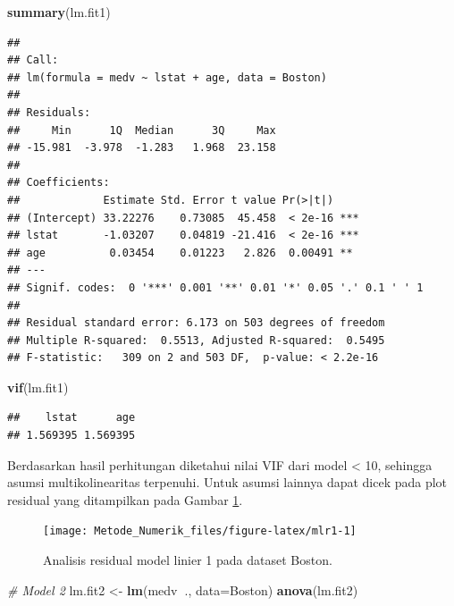 \documentclass[]{book}
\newenvironment{Shaded}{\begin{snugshade}}{\end{snugshade}}
\newcommand{\CommentTok}[1]{\textcolor[rgb]{0.56,0.35,0.01}{\textit{#1}}}
\newcommand{\DataTypeTok}[1]{\textcolor[rgb]{0.13,0.29,0.53}{#1}}
\newcommand{\KeywordTok}[1]{\textcolor[rgb]{0.13,0.29,0.53}{\textbf{#1}}}
\newcommand{\NormalTok}[1]{#1}
\newcommand{\OperatorTok}[1]{\textcolor[rgb]{0.81,0.36,0.00}{\textbf{#1}}}
\newcommand{\StringTok}[1]{\textcolor[rgb]{0.31,0.60,0.02}{#1}}
\theoremstyle{definition}
\theoremstyle{definition}
\theoremstyle{definition}
\theoremstyle{remark}
\begin{document}
\begin{Shaded}
\begin{Highlighting}[]
\KeywordTok{summary}\NormalTok{(lm.fit1)}
\end{Highlighting}
\end{Shaded}

\begin{verbatim}
## 
## Call:
## lm(formula = medv ~ lstat + age, data = Boston)
## 
## Residuals:
##     Min      1Q  Median      3Q     Max 
## -15.981  -3.978  -1.283   1.968  23.158 
## 
## Coefficients:
##             Estimate Std. Error t value Pr(>|t|)    
## (Intercept) 33.22276    0.73085  45.458  < 2e-16 ***
## lstat       -1.03207    0.04819 -21.416  < 2e-16 ***
## age          0.03454    0.01223   2.826  0.00491 ** 
## ---
## Signif. codes:  0 '***' 0.001 '**' 0.01 '*' 0.05 '.' 0.1 ' ' 1
## 
## Residual standard error: 6.173 on 503 degrees of freedom
## Multiple R-squared:  0.5513, Adjusted R-squared:  0.5495 
## F-statistic:   309 on 2 and 503 DF,  p-value: < 2.2e-16
\end{verbatim}

\begin{Shaded}
\begin{Highlighting}[]
\KeywordTok{vif}\NormalTok{(lm.fit1)}
\end{Highlighting}
\end{Shaded}

\begin{verbatim}
##    lstat      age 
## 1.569395 1.569395
\end{verbatim}

Berdasarkan hasil perhitungan diketahui nilai VIF dari model \textless{} 10, sehingga asumsi multikolinearitas terpenuhi. Untuk asumsi lainnya dapat dicek pada plot residual yang ditampilkan pada Gambar \ref{fig:mlr1}.

\begin{figure}

{\centering \texttt{[image: Metode\_Numerik\_files/figure-latex/mlr1-1]} 

}

\caption{Analisis residual model linier 1 pada dataset Boston.}\label{fig:mlr1}
\end{figure}

\begin{Shaded}
\begin{Highlighting}[]
\CommentTok{# Model 2}
\NormalTok{lm.fit2 <-}\StringTok{ }\KeywordTok{lm}\NormalTok{(medv}\OperatorTok{~}\NormalTok{., }\DataTypeTok{data=}\NormalTok{Boston)}
\KeywordTok{anova}\NormalTok{(lm.fit2)}
\end{Highlighting}
\end{Shaded}
\end{document}
